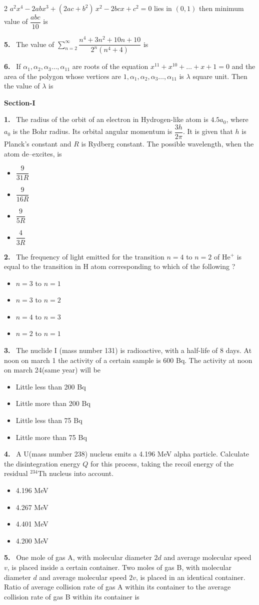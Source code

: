 \documentclass[10pt]{extarticle}
\newcommand{\papersec}[1]{\par\bigskip{\centering\Large\bfseries PAPER-#1\par}\medskip}
\newcommand{\partsec}[2]{\par\medskip\noindent{\large\bfseries PART-#1: #2}\par\smallskip}
\newcommand{\sect}[1]{\par\smallskip\noindent\textbf{#1}\par}
\newcommand{\qn}[1]{\par\smallskip\noindent\textbf{#1.}~}
\newenvironment{qoptions}{\begin{itemize}[leftmargin=1.8em,itemsep=1pt,topsep=2pt,label={}]}{\end{itemize}}
\newcommand{\opt}[2]{\item[(#1)] #2}
\begin{document}
\begin{multicols}{2}
$a^2x^4-2abx^3+(2ac+b^2)\,x^2-2bcx+c^2=0$ lies in $(0,1)$ then minimum value of $\dfrac{abc}{10}$ is
\qn{5} The value of $\displaystyle\sum_{n=2}^{\infty}\dfrac{n^4+3n^2+10n+10}{2^n(n^4+4)}$ is
\qn{6} If $\alpha_1,\alpha_2,\alpha_3\ldots,\alpha_{11}$ are roots of the equation $x^{11}+x^{10}+\ldots+x+1=0$ and the area of the polygon whose vertices are $1,\alpha_1,\alpha_2,\alpha_3\ldots,\alpha_{11}$ is $\lambda$ square unit. Then the value of $\lambda$ is
\papersec{2}
\partsec{1}{PHYSICS}
\sect{Section-I}
\qn{1} The radius of the orbit of an electron in Hydrogen-like atom is $4.5a_0$, where $a_0$ is the Bohr radius. Its orbital angular momentum is $\dfrac{3h}{2\pi}$. It is given that $h$ is Planck's constant and $R$ is Rydberg constant. The possible wavelength, when the atom de--excites, is
\begin{qoptions}
\opt{A}{$\dfrac{9}{31R}$}
\opt{B}{$\dfrac{9}{16R}$}
\opt{C}{$\dfrac{9}{5R}$}
\opt{D}{$\dfrac{4}{3R}$}
\end{qoptions}
\qn{2} The frequency of light emitted for the transition $n=4$ to $n=2$ of $\mathrm{He^+}$ is equal to the transition in H atom corresponding to which of the following ?
\begin{qoptions}
\opt{A}{$n=3$ to $n=1$}
\opt{B}{$n=3$ to $n=2$}
\opt{C}{$n=4$ to $n=3$}
\opt{D}{$n=2$ to $n=1$}
\end{qoptions}
\qn{3} The nuclide I (mass number 131) is radioactive, with a half-life of 8 days. At noon on march 1 the activity of a certain sample is 600 Bq. The activity at noon on march 24(same year) will be
\begin{qoptions}
\opt{A}{Little less than 200 Bq}
\opt{B}{Little more than 200 Bq}
\opt{C}{Little less than 75 Bq}
\opt{D}{Little more than 75 Bq}
\end{qoptions}
\qn{4} A U(mass number 238) nucleus emits a 4.196 MeV alpha particle. Calculate the disintegration energy $Q$ for this process, taking the recoil energy of the residual $^{234}$Th nucleus into account.
\begin{qoptions}
\opt{A}{4.196 MeV}
\opt{B}{4.267 MeV}
\opt{C}{4.401 MeV}
\opt{D}{4.200 MeV}
\end{qoptions}
\qn{5} One mole of gas A, with molecular diameter $2d$ and average molecular speed $v$, is placed inside a certain container. Two moles of gas B, with molecular diameter $d$ and average molecular speed $2v$, is placed in an identical container. Ratio of average collision rate of gas A within its container to the average collision rate of gas B within its container is
\begin{qoptions}

\end{qoptions}
\end{multicols}
\end{document}
